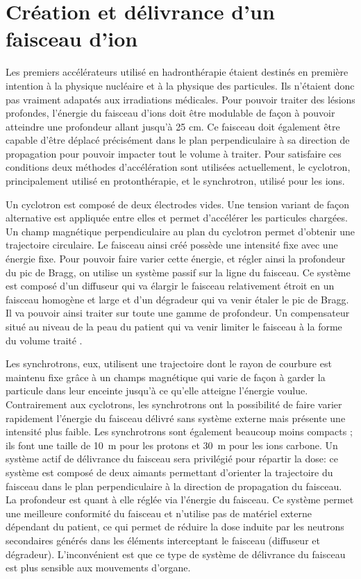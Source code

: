 \documentclass[11pt,a4paper,oldfontcommands]{memoir}
\begin{document}
\section{Création et délivrance d'un faisceau d'ion}
Les premiers accélérateurs utilisé en hadronthérapie étaient destinés en première intention à la physique nucléaire et à la physique des particules. Ils n'étaient donc pas vraiment adapatés aux irradiations médicales. Pour pouvoir traiter des lésions profondes, l'énergie du faisceau d'ions doit être modulable de façon à pouvoir atteindre une profondeur allant jusqu'à 25 cm. Ce faisceau doit également être capable d'être déplacé précisément dans le plan perpendiculaire à sa direction de propagation pour pouvoir impacter tout le volume à traiter. Pour satisfaire ces conditions deux méthodes d'accélération sont utilisées actuellement, le cyclotron, principalement utilisé en protonthérapie, et le synchrotron, utilisé pour les ions.

Un cyclotron est composé de deux électrodes vides. Une tension variant de façon alternative est appliquée entre elles et permet d'accélérer les particules chargées. Un champ magnétique perpendiculaire au plan du cyclotron permet d'obtenir une trajectoire circulaire. Le faisceau ainsi créé possède une intensité fixe avec une énergie fixe. Pour pouvoir faire varier cette énergie, et régler ainsi la profondeur du pic de Bragg, on utilise un système passif  sur la ligne du faisceau. Ce système est composé d'un diffuseur qui va élargir le faisceau relativement étroit en un faisceau homogène et large et d'un dégradeur qui va venir étaler le pic de Bragg. Il va pouvoir ainsi traiter sur toute une gamme de profondeur. Un compensateur situé au niveau de la peau du patient qui va venir limiter le faisceau à la forme du volume traité . 

Les synchrotrons, eux, utilisent une trajectoire dont le rayon de courbure est maintenu fixe grâce à un champs magnétique qui varie de façon à garder la particule dans leur enceinte jusqu'à ce qu'elle atteigne l'énergie voulue. Contrairement aux cyclotrons, les synchrotrons ont la possibilité de faire varier rapidement l'énergie du faisceau délivré sans système externe mais présente une intensité plus faible. Les synchrotrons sont également beaucoup moins compacts ; ils font une taille de 10~m pour les protons et 30~m pour les ions carbone. Un système actif de délivrance du faisceau sera privilégié pour répartir la dose: ce système est composé de deux aimants permettant d'orienter la trajectoire du faisceau dans le plan perpendiculaire à la direction de propagation du faisceau. La profondeur est quant à elle réglée via l'énergie du faisceau. Ce système permet une meilleure conformité du faisceau et n'utilise pas de matériel externe dépendant du patient, ce qui permet de réduire la dose induite par les neutrons secondaires générés dans les éléments interceptant le faisceau (diffuseur et dégradeur). L'inconvénient est que ce type de système de délivrance du faisceau est plus sensible aux mouvements d'organe. 
\end{document}
